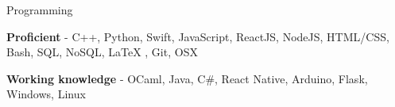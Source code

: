 \vspace{-1mm}
\vspace{3mm}
	\cventry
	{}
	{Programming}
	{}
	{}
	{\begin{cvitems}
		\vspace{-5mm}
		\item {\textbf{Proficient} - C++, Python, Swift, JavaScript, ReactJS, NodeJS, HTML/CSS, Bash, SQL, NoSQL, LaTeX , Git, OSX}
		\item {\textbf{Working knowledge} - OCaml, Java, C\#, React Native, Arduino, Flask, Windows, Linux}
		\end{cvitems}}